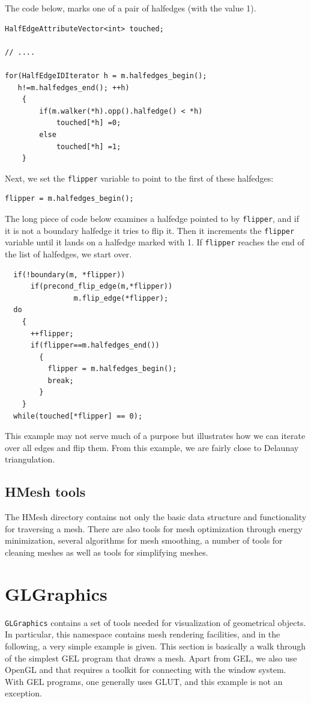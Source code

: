 \documentclass[a4paper]{article}
\begin{document}
The code below, marks one of a pair of halfedges (with the value 1).
\begin{verbatim}
HalfEdgeAttributeVector<int> touched;

// ....

for(HalfEdgeIDIterator h = m.halfedges_begin(); 
   h!=m.halfedges_end(); ++h)
    {
        if(m.walker(*h).opp().halfedge() < *h)
            touched[*h] =0;
        else
            touched[*h] =1;
    }
\end{verbatim}
Next, we set the \texttt{flipper} variable to point to the first of these halfedges:
\begin{verbatim}
flipper = m.halfedges_begin();
\end{verbatim}
The long piece of code below examines a halfedge pointed to by \texttt{flipper}, and if it is not a boundary halfedge it tries to flip it. Then it increments the \texttt{flipper} variable until it lands on a halfedge marked with 1. If \texttt{flipper} reaches the end of the list of halfedges, we start over.
\begin{verbatim}
  if(!boundary(m, *flipper)) 
      if(precond_flip_edge(m,*flipper))
                m.flip_edge(*flipper);
  do
    {
      ++flipper;
      if(flipper==m.halfedges_end())
        {
          flipper = m.halfedges_begin();
          break;
        }
    }
  while(touched[*flipper] == 0);
\end{verbatim}
This example may not serve much of a purpose but illustrates how we can iterate over all edges and flip them. From this example, we are fairly close to Delaunay triangulation.

\subsection{HMesh tools}

The HMesh directory contains not only the basic data structure and functionality for traversing a mesh. There are also tools for mesh optimization through energy minimization, several algorithms for mesh smoothing, a number of tools for cleaning meshes as well as tools for simplifying meshes.

\section{GLGraphics}

\texttt{GLGraphics} contains a set of tools needed for visualization of geometrical objects. In particular, this namespace contains mesh rendering facilities, and in the following, a very simple example is given. This section is basically a walk through of the simplest GEL program that draws a mesh. Apart from GEL, we also use OpenGL and that requires a toolkit for connecting with the window system. With GEL programs, one generally uses GLUT, and this example is not an exception.
\end{document}
